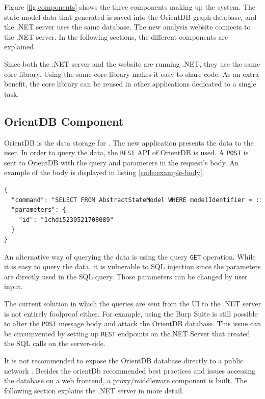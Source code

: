Figure \ref{fig:components} shows the three components making up the system. The state model data that \testar generated is saved into the OrientDB graph database, and the .NET server uses the same database. The new \testar analysis website connects to the .NET server. In the following sections, the different components are explained. 

Since both the .NET server and the website are running .NET, they use the same core library. Using the same core library makes it easy to share code. As an extra benefit, the core library can be reused in other applications dedicated to a single task. 

\subsection{OrientDB Component}
OrientDB is the data storage for \testar. The new application presents the data to the user. In order to query the data, the \verb|REST| API of OrientDB is used. A \verb|POST| is sent to OrientDB with the query and parameters in the request's body. An example of the body is displayed in listing \ref{code:example-body}.

\begin{lstlisting}[language=xml, caption=Get AbstractStateModel by the model identifier, label=code:example-body]
{
  "command": "SELECT FROM AbstractStateModel WHERE modelIdentifier = :id",
  "parameters": {
    "id": "1chdi5230521708089"
  }
}
\end{lstlisting}

An alternative way of querying the data is using the query \verb|GET| operation. While it is easy to query the data, it is vulnerable to SQL injection since the parameters are directly used in the SQL query. Those parameters can be changed by user input. 

The current solution in which the queries are sent from the UI to the .NET server is not entirely foolproof either. For example, using the Burp Suite is still possible to alter the \verb|POST| message body and attack the OrientDB database. This issue can be circumvented by setting up \verb|REST| endpoints on the.NET Server that created the SQL calls on the server-side.

It is not recommended to expose the OrientDB database directly to a public network \cite{orientdb-security}. Besides the orientDb recommended best practices and issues accessing the database on a web frontend, a proxy/middleware component is built. The following section explains the .NET server in more detail. 

